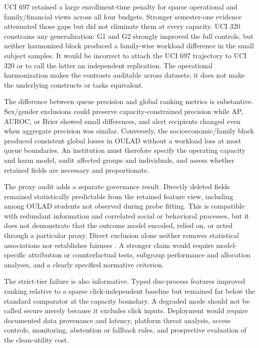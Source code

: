 \documentclass[11pt]{article}
\begin{document}
UCI 697 retained a large enrollment-time penalty for sparse operational and family/financial views across all four budgets. Stronger semester-one evidence attenuated those gaps but did not eliminate them at every capacity. UCI 320 constrains any generalization: G1 and G2 strongly improved the full controls, but neither harmonized block produced a family-wise workload difference in the small subject samples. It would be incorrect to attach the UCI 697 trajectory to UCI 320 or to call the latter an independent replication. The operational harmonization makes the contrasts auditable across datasets; it does not make the underlying constructs or tasks equivalent.

The difference between queue precision and global ranking metrics is substantive. Sex/gender exclusions could preserve capacity-constrained precision while AP, AUROC, or Brier showed small differences, and alert recipients changed even when aggregate precision was similar. Conversely, the socioeconomic/family block produced consistent global losses in OULAD without a workload loss at most queue boundaries. An institution must therefore specify the operating capacity and harm model, audit affected groups and individuals, and assess whether retained fields are necessary and proportionate.

The proxy audit adds a separate governance result. Directly deleted fields remained statistically predictable from the retained feature view, including among OULAD students not observed during probe fitting. This is compatible with redundant information and correlated social or behavioral processes, but it does not demonstrate that the outcome model encoded, relied on, or acted through a particular proxy. Direct exclusion alone neither removes statistical associations nor establishes fairness \citep{gardner2019fairness,pham2025fairness}. A stronger claim would require model-specific attribution or counterfactual tests, subgroup performance and allocation analyses, and a clearly specified normative criterion.

The strict-tier failure is also informative. Typed due-process features improved ranking relative to a sparse click-independent baseline but remained far below the standard comparator at the capacity boundary. A degraded mode should not be called secure merely because it excludes click inputs. Deployment would require documented data provenance and latency, platform threat analysis, access controls, monitoring, abstention or fallback rules, and prospective evaluation of the clean-utility cost.
\end{document}

